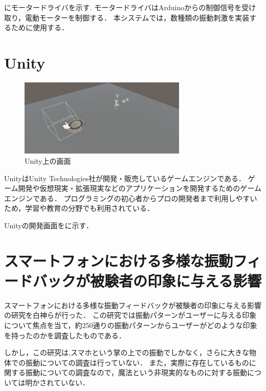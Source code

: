 にモータードライバを示す.
モータードライバはArduinoからの制御信号を受け取り，電動モーターを制御する．
本システムでは，数種類の振動刺激を実装するために使用する．

\newpage

\section{Unity}

\begin{figure}[h]
\centering
\includegraphics[clip,width=8cm]{./fig/unity_first.png}
\caption{Unity上の画面}\label{unity}
\end{figure}

Unity\cite{unity}はUnity Technologies社が開発・販売しているゲームエンジンである．
ゲーム開発や仮想現実・拡張現実などのアプリケーションを開発するためのゲームエンジンである．
プログラミングの初心者からプロの開発者まで利用しやすいため，学習や教育の分野でも利用されている．

Unityの開発画面をに示す．

\section{スマートフォンにおける多様な振動フィードバックが被験者の印象に与える影響}
スマートフォンにおける多様な振動フィードバックが被験者の印象に与える影響\cite{smart}の研究を白神らが行った．
この研究では振動パターンがユーザーに与える印象について焦点を当て，約250通りの振動パターンからユーザーがどのような印象を持ったのかを調査したものである．


しかし，この研究は,スマホという掌の上での振動でしかなく，さらに大きな物体での振動についての調査は行っていない．
また，実際に存在しているものに関する振動についての調査なので，魔法という非現実的なものに対する振動については明かされていない．





